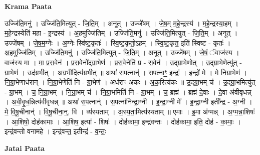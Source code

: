 \documentclass[17pt]{extarticle}
\begin{document}
\textbf{Krama Paata} \newline

उज्जि॑ति॒मनु॑ । उज्जि॑ति॒मित्युत् - जि॒ति॒म् । अनूत् । उज्जे॑षम् । जे॒ष॒म् म॒हे॒न्द्रस्य॑ । म॒हे॒न्द्रस्या॒हम् । म॒हे॒न्द्रस्येति॑ महा - इ॒न्द्रस्य॑ । अ॒हमुज्जि॑तिम् । उज्जि॑ति॒मनु॑ । उज्जि॑ति॒मित्युत् - जि॒ति॒म् । अनूत् । उज्जे॑षम् । जे॒ष॒म॒ग्नेः । अ॒ग्नेः स्वि॑ष्ट॒कृतः॑ । स्वि॒ष्ट॒कृतो॒ऽहम् । स्वि॒ष्ट॒कृत॒ इति॑ स्विष्ट - कृतः॑ । अ॒हमुज्जि॑तिम् । उज्जि॑ति॒मनु॑ । उज्जि॑ति॒मित्युत् - जि॒ति॒म् । अनूत् । उज्जे॑षम् । जे॒षं॒ ॅवाज॑स्य । वाज॑स्य मा । मा॒ प्र॒स॒वेन॑ । प्र॒स॒वेनो᳚द्ग्रा॒भेण॑ । प्र॒स॒वेनेति॑ प्र - स॒वेन॑ । उ॒द्ग्रा॒भेणोत् । उ॒द्ग्रा॒भेणेत्यु॑त् - ग्रा॒भेण॑ । उद॑ग्रभीत् । अ॒ग्र॒भी॒दित्य॑ग्रभीत् ॥ अथा॑ स॒पत्नान्॑ । स॒पत्नाꣳ॒॒ इन्द्रः॑ । इन्द्रो॑ मे । मे॒ नि॒ग्रा॒भेण॑ । नि॒ग्रा॒भेणाध॑रान् । नि॒ग्रा॒भेणेति॑ नि - ग्रा॒भेण॑ । अध॑राꣳ अकः । अ॒क॒रित्य॑कः ॥ उ॒द्ग्रा॒भम् च॑ । उ॒द्ग्रा॒भमित्यु॑त् - ग्रा॒भम् । च॒ नि॒ग्रा॒भम् । नि॒ग्रा॒भम् च॑ । नि॒ग्रा॒भमिति॑ नि - ग्रा॒भम् । च॒ ब्रह्म॑ । ब्रह्म॑ दे॒वाः । दे॒वा अ॑वीवृधन्न् । अ॒वी॒वृ॒ध॒न्नित्य॑वीवृधन्न् ॥ अथा॑ स॒पत्नान्॑ । स॒पत्ना॑निन्द्रा॒ग्नी । इ॒न्द्रा॒ग्नी मे᳚ । इ॒न्द्रा॒ग्नी इती᳚न्द्र - अ॒ग्नी । मे॒ वि॒षू॒चीनान्॑ । वि॒षू॒चीना॒न्॒. वि । व्य॑स्यताम् । अ॒स्य॒ता॒मित्य॑स्यताम् ॥ एमाः । इ॒मा अ॑ग्मन्न् । अ॒ग्म॒न्ना॒शिषः॑ । आ॒शिषो॒ दोह॑कामाः । आ॒शिष॒ इत्या᳚ - शिषः॑ । दोह॑कामा॒ इन्द्र॑वन्तः । दोह॑कामा॒ इति॒ दोह॑ - का॒माः॒ । इन्द्र॑वन्तो वनामहे । इन्द्र॑वन्त॒ इतीन्द्र॑ - व॒न्तः॒ \newline

\textbf{Jatai Paata} \newline
\end{document}
